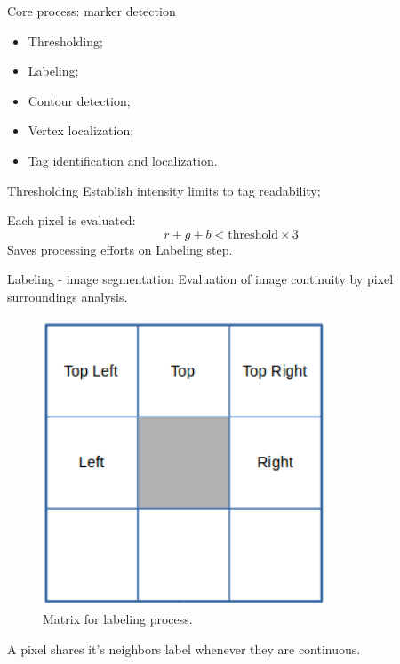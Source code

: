 \documentclass[10pt]{beamer}
\begin{document}

\begin{frame}[fragile]{Core process: marker detection}
  \begin{itemize}
    \item Thresholding;
    \item Labeling;
    \item Contour detection;
    \item Vertex localization;
    \item Tag identification and localization.
  \end{itemize}
\end{frame}


\begin{frame}[fragile]{Thresholding}
  Establish intensity limits to tag readability;

  Each pixel is evaluated:
    \begin{equation*}
      r+g+b<\text{threshold}\times 3
    \end{equation*}
  Saves processing efforts on Labeling step.
\end{frame}


\begin{frame}[fragile]{Labeling - image segmentation}
  Evaluation of image continuity by pixel surroundings analysis.
  \begin{figure}
    \centering
    \includegraphics[scale=0.25]{labeling}
    \caption{Matrix for labeling process.}
  \end{figure}
  A pixel shares it's neighbors label whenever they are continuous.
\end{frame}
\end{document}
